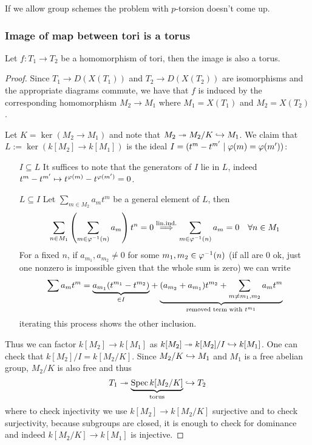 \begin{remark}
If we allow group schemes the problem with $p$-torsion doesn't come up.
\end{remark}













\subsubsection{Image of map between tori is a torus}

\begin{proposition}\label{PrImageOfTorusInATorusIsATorus}
Let $f:T_1\to T_2$ be a homomorphism of tori, then the image is also a torus.
\end{proposition}
\begin{proof}
Since $T_1\to D(X(T_1))$ and $T_2\to D(X(T_2))$ are isomorphisms and the appropriate diagrams commute, we have that $f$ is induced by the corresponding homomorphism $M_2\to M_1$ where $M_1=X(T_1)$ and $M_2=X(T_2)$.

Let $K=\ker(M_2\to M_1)$ and note that $M_2\twoheadrightarrow M_2/K\hookrightarrow M_1$. We claim that $L:=\ker(k[M_2]\to k[M_1])$ is the ideal $I=(t^m-t^{m'}\mid \varphi(m)=\varphi(m'))$:
\setlength{\leftmargini}{0cm}
\begin{itemize}
\item[$\boxed{I\subseteq L}$] It suffices to note that the generators of $I$ lie in $L$, indeed $t^m-t^{m'}\mapsto t^{\varphi(m)}-t^{\varphi(m')}=0$.
\item[$\boxed{L\subseteq I}$] Let $\sum_{m\in M_2}a_mt^m$ be a general element of $L$, then
\[\sum_{n\in M_1}\left({\sum_{m\in \varphi^{-1}(n)}a_m}\right)t^n=0\overset{\text{lin.ind.}}\Longrightarrow \sum_{m\in \varphi^{-1}(n)}a_m=0\quad \forall n\in M_1\]
For a fixed $n$, if $a_{m_1},a_{m_2}\neq 0$ for some $m_1,m_2\in \varphi^{-1}(n)$ (if all are $0$ ok, just one nonzero is impossible given that the whole sum is zero) we can write
\[\sum a_m t^m=\underset{\in I}{\underbrace{a_{m_1}(t^{m_1}-t^{m_2})}}+\underset{\text{removed term with }t^{m_1}}{\underbrace{(a_{m_2}+a_{m_1})t^{m_2}+\sum_{m\neq m_1,m_2}a_mt^m}}\]
iterating this process shows the other inclusion.
\end{itemize}
\setlength{\leftmargini}{0.5cm}
Thus we can factor $k[M_2]\to k[M_1]$ as $k[M_2]\twoheadrightarrow k[M_2]/I\hookrightarrow k[M_1]$. One can check that $k[M_2]/I=k[M_2/K]$. Since $M_2/K\hookrightarrow M_1$ and $M_1$ is a free abelian group, $M_2/K$ is also free and thus
\[T_1\twoheadrightarrow \underset{\text{torus}}{\underbrace{\operatorname{Spec} k[M_2/K]}}\hookrightarrow T_2\]
where to check injectivity we use $k[M_2]\to k[M_2/K]$ surjective and to check surjectivity, because subgroups are closed, it is enough to check for dominance and indeed $k[M_2/K]\to k[M_1]$ is injective.
\end{proof}

